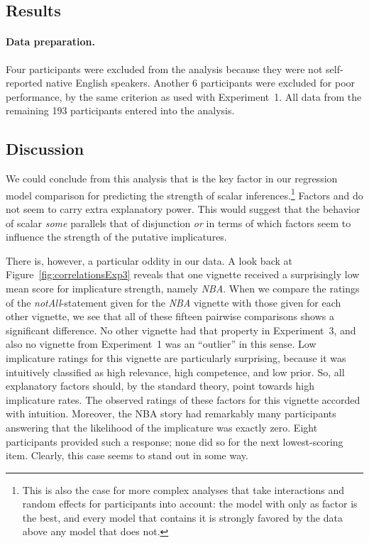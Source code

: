 \documentclass[12pt]{article}
\begin{document}
\subsection*{Results}

\paragraph{Data preparation.} Four participants were excluded from the analysis because they
were not self-reported native English speakers. Another 6 participants were excluded for poor
performance, by the same criterion as used with Experiment~1. All data from the remaining 193
participants entered into the analysis.



\subsection{Discussion}

We could conclude from this analysis that \pri is the key factor in our regression model
comparison for predicting the strength of scalar inferences.\footnote{This is also the case for
  more complex analyses that take interactions and random effects for participants into
  account: the model with only \pri as factor is the best, and every model that contains it is
  strongly favored by the data above any model that does not.} Factors \rel and \com do not
seem to carry extra explanatory power. This would suggest that the behavior of scalar
\emph{some} parallels that of disjunction \emph{or} in terms of which factors seem to influence
the strength of the putative implicatures. 

There is, however, a particular oddity in our data. A look back at
Figure~\ref{fig:correlationsExp3} reveals that one vignette received a surprisingly low mean
score for implicature strength, namely \emph{NBA}. When we compare the ratings of the
\emph{notAll}-statement given for the \emph{NBA} vignette with those given for each other
vignette, we see that all of these fifteen pairwise comparisons shows a significant
difference. No other vignette had that property in Experiment~3, and also no vignette from
Experiment~1 was an ``outlier'' in this sense. Low implicature ratings for this vignette are
particularly surprising, because it was intuitively classified as high relevance, high
competence, and low prior. So, all explanatory factors should, by the standard theory, point
towards high implicature rates. The observed ratings of these factors for this vignette
accorded with intuition. Moreover, the NBA story had remarkably many participants answering
that the likelihood of the implicature was exactly zero. Eight participants provided such a
response; none did so for the next lowest-scoring item. Clearly, this case seems to stand out
in some way.
\end{document}
